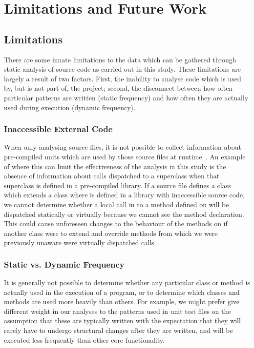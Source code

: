 \chapter{Limitations and Future Work}\label{C:future}

\section{Limitations}
There are some innate limitations to the data which can be gathered through static analysis of source code as carried out in this study. These limitations are largely a result of two factors. First, the inability to analyse code which is used by, but is not part of, the project; second, the disconnect between how often particular patterns are written (static frequency) and how often they are actually used during execution (dynamic frequency).

\subsection{Inaccessible External Code}
\label{InaccessibleCode}
When only analysing source files, it is not possible to collect information about pre-compiled units which are used by those source files at runtime~\cite{StaticAnalysisLimits}. An example of where this can limit the effectiveness of the analysis in this study is the absence of information about calls dispatched to a superclass when that superclass is defined in a pre-compiled library. If a source file defines a class  which extends a class  where  is defined in a library with inaccessible source code, we cannot determine whether a local call in  to a method defined on  will be dispatched statically or virtually because we cannot see the method declaration. This could cause unforeseen changes to the behaviour of the methods on  if another class  were to extend  and override methods from  which we were previously unaware were virtually dispatched calls.

\subsection{Static vs. Dynamic Frequency}
It is generally not possible to determine whether any particular class or method is actually used in the execution of a program, or to determine which classes and methods are used more heavily than others. For example, we might prefer give different weight in our analyses to the patterns used in unit test files on the assumption that these are typically written with the expectation that they will rarely have to undergo structural changes after they are written, and will be executed less frequently than other core functionality.

